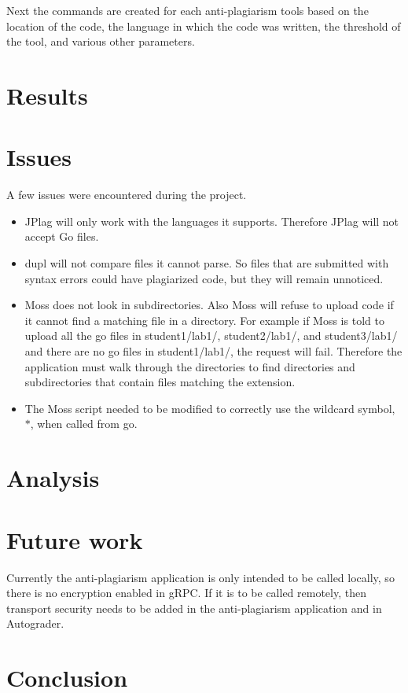 \documentclass[12pt]{article}
\begin{document}
			Next the commands are created for each anti-plagiarism tools based on the location of the code, the language in which the code was written, the threshold of the tool, and various other parameters.
			
	\section{Results}
	\section{Issues}
		A few issues were encountered during the project.
		\begin{itemize}
			\item JPlag will only work with the languages it supports. Therefore JPlag will not accept Go files. 
			\item dupl will not compare files it cannot parse. So files that are submitted with syntax errors could have plagiarized code, but they will remain unnoticed.
			\item Moss does not look in subdirectories. Also Moss will refuse to upload code if it cannot find a matching file in a directory. For example if Moss is told
			to upload all the go files in student1/lab1/, student2/lab1/, and student3/lab1/ and there are no go files in student1/lab1/, the request will fail. Therefore
			the application must walk through the directories to find directories and subdirectories that contain files matching the extension.
			\item The Moss script needed to be modified to correctly use the wildcard symbol, $*$, when called from go.
		\end{itemize}
	\section{Analysis}
	\section{Future work}
		Currently the anti-plagiarism application is only intended to be called locally, so there is no encryption enabled in gRPC. If it is to be called remotely, then transport security needs to be added in the anti-plagiarism application and in Autograder.
	\section{Conclusion}
	
	
\end{document}

